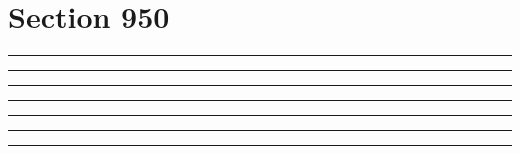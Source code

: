 \documentclass[11pt,a4paper]{article}
\begin{document}
\section{Section 950}
\begin{swarmwrap}%
  \begin{minipage}[t]{4cm}
    \centering
    \textcolor{red!20}{\rule{\linewidth}{7cm}}
  \end{minipage}%
\end{swarmwrap}%
\swarmwrapnext\lipsum[1]\lipsum[2]\lipsum[3]
\begin{swarmwrap}%
  \begin{minipage}[t]{5cm}
    \centering
    \textcolor{red!20}{\rule{\linewidth}{8cm}}
  \end{minipage}%
\end{swarmwrap}%
\swarmwrapnext\lipsum[1]\lipsum[2]\lipsum[3]\lipsum[4]
\begin{swarmwrap}%
  \begin{minipage}[t]{2cm}
    \centering
    \textcolor{red!20}{\rule{\linewidth}{9cm}}
  \end{minipage}%
\end{swarmwrap}%
\swarmwrapnext\lipsum[1]\lipsum[2]\lipsum[3]\lipsum[4]\lipsum[5]
\begin{swarmwrap}%
  \begin{minipage}[t]{3cm}
    \centering
    \textcolor{red!20}{\rule{\linewidth}{10cm}}
  \end{minipage}%
\end{swarmwrap}%
\swarmwrapnext\lipsum[1]\lipsum[2]\lipsum[3]\lipsum[4]\lipsum[5]\lipsum[6]
\begin{swarmwrap}%
  \begin{minipage}[t]{4cm}
    \centering
    \textcolor{red!20}{\rule{\linewidth}{2cm}}
  \end{minipage}%
\end{swarmwrap}%
\swarmwrapnext\lipsum[1]
\begin{swarmwrap}%
  \begin{minipage}[t]{5cm}
    \centering
    \textcolor{red!20}{\rule{\linewidth}{3cm}}
  \end{minipage}%
\end{swarmwrap}%
\swarmwrapnext\lipsum[1]\lipsum[2]
\begin{swarmwrap}%
  \begin{minipage}[t]{2cm}
    \centering
    \textcolor{red!20}{\rule{\linewidth}{4cm}}
  \end{minipage}%
\end{swarmwrap}%
\end{document}

